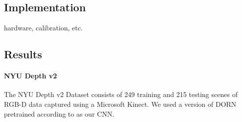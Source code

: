 \subsection{Implementation} 

hardware, calibration, etc.

\subsection{Results} 
\paragraph{NYU Depth v2}
The NYU Depth v2 Dataset consists of 249 training and 215 testing scenes of
RGB-D data captured using a Microsoft Kinect. We used a version of DORN
pretrained according to \cite{Fu. et al} as our CNN.

